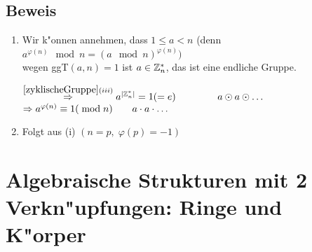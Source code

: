  
 \subsection{Beweis}
 \begin{enumerate}
 \item
 Wir k"onnen annehmen, dass $1 \leq a < n $ (denn $a^{\varphi(n)} \mod{n}= (a \mod{n})^{\varphi(n)})$\\
 wegen ggT$(a,n)=1$ ist $a \in \Z^*_n$, das ist eine endliche Gruppe.
 
 $\stackrel{\ref{zyklischeGruppe}(iii)}{\Rightarrow} a^{|\Z^*_n|}=1(=e) \hspace{1.5cm} a \odot a \odot \dots$\\
 $\Rightarrow a^{\varphi(n)} \equiv 1 (\mod{n}) \hspace{0.7cm} a \cdot a \cdot \dots $ 
 \item
 Folgt aus (i) $(n=p,\; \varphi (p) = -1)$

\end{enumerate}

\section{Algebraische Strukturen mit 2 Verkn"upfungen: Ringe und K"orper}

